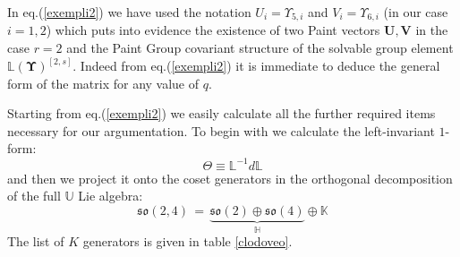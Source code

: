 \documentclass[10pt,a4paper]{article}
\newcommand{\so}{\mathfrak{so}}
\begin{document}
\par
In eq.(\ref{exempli2}) we have used the notation $U_i = \Upsilon_{5,i}$ and  $V_i = \Upsilon_{6,i}$  (in our case $i=1,2$) which puts into evidence the existence of two Paint vectors $\mathbf{U},\mathbf{V}$ in the case $r=2$ and the Paint Group covariant structure of the solvable group element $\mathbb{L}(\boldsymbol\Upsilon)^{[2,s]}$. Indeed from eq.(\ref{exempli2}) it is immediate to deduce the general form of the matrix for any value of $q$.
\par
Starting from eq.(\ref{exempli2}) we easily calculate all the further required items necessary for our argumentation. To begin with we calculate the left-invariant $1$-form:
$$\Theta \equiv \mathbb{L}^{-1} d\mathbb{L}$$
 and then we project it onto the coset generators
in the orthogonal decomposition of the full $\mathbb{U}$ Lie algebra:
\begin{equation}\label{carnicchio}
  \so(2,4) \, = \, \underbrace{\so(2)\oplus\so(4)}_{\mathbb{H}} \oplus \mathbb{K}
\end{equation}
The list of $K$ generators is given in table \ref{clodoveo}.
\end{document}
